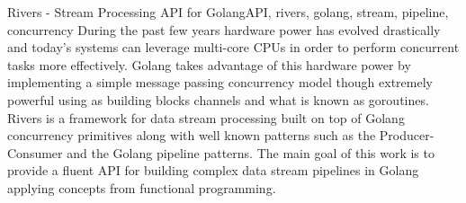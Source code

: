 \documentclass[tc]{iiufrgs}
\begin{document}
\begin{englishabstract}{Rivers - Stream Processing API for Golang}{API, rivers, golang, stream, pipeline, concurrency}
During the past few years hardware power has evolved drastically and today's systems can leverage multi-core CPUs in order to perform concurrent tasks more effectively.
Golang takes advantage of this hardware power by implementing a simple message passing concurrency model though extremely powerful using as building blocks channels and what is known as goroutines.
Rivers is a framework for data stream processing built on top of Golang concurrency primitives along with well known patterns such as the Producer-Consumer and the Golang pipeline patterns.
The main goal of this work is to provide a fluent API for building complex data stream pipelines in Golang applying concepts from functional programming.
\end{englishabstract}

\onehalfspacing











%
%



\end{document}
